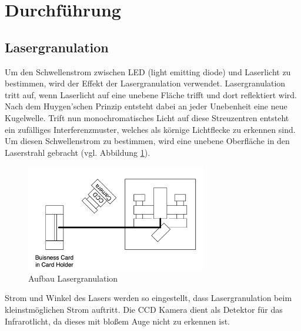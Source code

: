 \section{Durchführung}
\label{sec:Durchführung}
\subsection{Lasergranulation}
\label{sec:Lasergranulation}
Um den Schwellenstrom zwischen LED (light emitting diode) und Laserlicht zu bestimmen,
wird der Effekt der Lasergranulation verwendet.
Lasergranulation tritt auf, wenn Laserlicht auf eine unebene Fläche trifft 
und dort reflektiert wird.
Nach dem Huygen'schen Prinzip entsteht dabei an jeder Unebenheit eine neue Kugelwelle.
Trift nun monochromatisches Licht auf diese Streuzentren entsteht ein zufälliges Interferenzmuster,
welches als körnige Lichtflecke zu erkennen sind.
Um diesen Schwellenstrom zu bestimmen, wird eine unebene Oberfläche in den Laserstrahl gebracht (vgl. Abbildung \ref{fig:Lasergranulation}).
\begin{figure}[h]
    \centering
    \includegraphics[width=0.7\textwidth]{abb/aufbau1.png}
    \caption{Aufbau Lasergranulation \cite{aufbau}}
    \label{fig:Lasergranulation}
\end{figure}
Strom und Winkel des Lasers werden so eingestellt,
dass Lasergranulation beim kleinstmöglichen Strom auftritt.
Die CCD Kamera dient als Detektor für das Infrarotlicht,
da dieses mit bloßem Auge nicht zu erkennen ist.

